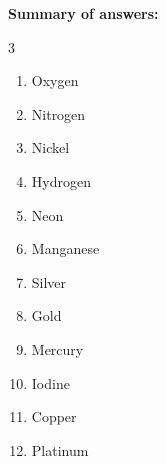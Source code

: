 \begin{exercise}
\begin{solu}
        \textbf{Summary of answers:}
        \begin{multicols}{3}
            \begin{enumerate}[label=\letraminuscula]
                \item Oxygen
                \item Nitrogen
                \item Nickel
                \item Hydrogen
                \item Neon
                \item Manganese
                \item Silver
                \item Gold
                \item Mercury
                \item Iodine
                \item Copper
                \item Platinum
            \end{enumerate}
        \end{multicols}
    \end{solu}
\end{exercise}

